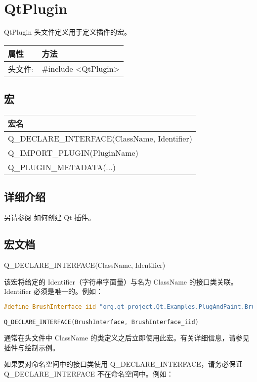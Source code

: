 \chapter{QtPlugin}

QtPlugin 头文件定义用于定义插件的宏。

\begin{tabular}{|l|l|}
\hline
属性 &	方法\\
\hline
头文件:& 	\#include <QtPlugin>\\
\hline
\end{tabular}

\section{宏}

\begin{tabular}{|l|}
\hline
宏名 \\
\hline
Q\_DECLARE\_INTERFACE(ClassName, Identifier) \\ 
\hline
Q\_IMPORT\_PLUGIN(PluginName) \\ 
\hline
Q\_PLUGIN\_METADATA(...) \\
\hline
\end{tabular}





\section{详细介绍}
另请参阅 如何创建 Qt 插件。

\section{宏文档}

Q\_DECLARE\_INTERFACE(ClassName, Identifier)

该宏将给定的 Identifier（字符串字面量）与名为 ClassName 的接口类关联。
Identifier 必须是唯一的。例如：

\begin{lstlisting}[language=C++]
#define BrushInterface_iid "org.qt-project.Qt.Examples.PlugAndPaint.BrushInterface/1.0"

Q_DECLARE_INTERFACE(BrushInterface, BrushInterface_iid)
\end{lstlisting}

通常在头文件中 ClassName 的类定义之后立即使用此宏。有关详细信息，请参见插件与绘制示例。

如果要对命名空间中的接口类使用 Q\_DECLARE\_INTERFACE，请务必保证 Q\_DECLARE\_INTERFACE 不在命名空间中。例如：

